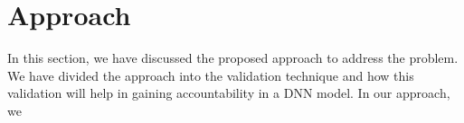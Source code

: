 \section{Approach}
\label{sec:approach}
In this section, we have discussed the proposed approach to address the problem. We have divided the approach into the validation technique and how this validation will help in gaining accountability in a DNN model. In our approach, we 

